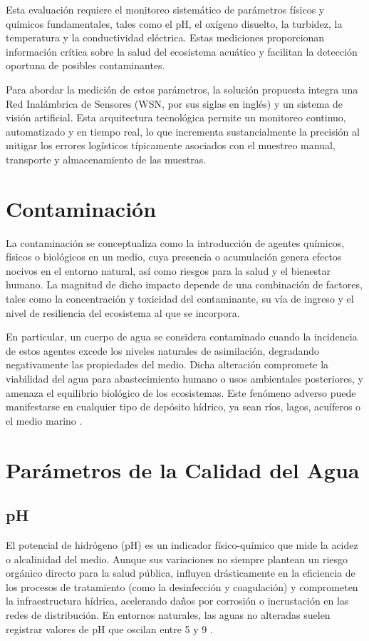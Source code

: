 Esta evaluación requiere el monitoreo sistemático de parámetros físicos y químicos fundamentales, tales como el pH, el oxígeno disuelto, la turbidez, la temperatura y la conductividad eléctrica. Estas mediciones proporcionan información crítica sobre la salud del ecosistema acuático y facilitan la detección oportuna de posibles contaminantes.

Para abordar la medición de estos parámetros, la solución propuesta integra una Red Inalámbrica de Sensores (WSN, por sus siglas en inglés) y un sistema de visión artificial. Esta arquitectura tecnológica permite un monitoreo continuo, automatizado y en tiempo real, lo que incrementa sustancialmente la precisión al mitigar los errores logísticos típicamente asociados con el muestreo manual, transporte y almacenamiento de las muestras.

\section{Contaminación}
La contaminación se conceptualiza como la introducción de agentes químicos, físicos o biológicos en un medio, cuya presencia o acumulación genera efectos nocivos en el entorno natural, así como riesgos para la salud y el bienestar humano. La magnitud de dicho impacto depende de una combinación de factores, tales como la concentración y toxicidad del contaminante, su vía de ingreso y el nivel de resiliencia del ecosistema al que se incorpora.

En particular, un cuerpo de agua se considera contaminado cuando la incidencia de estos agentes excede los niveles naturales de asimilación, degradando negativamente las propiedades del medio. Dicha alteración compromete la viabilidad del agua para abastecimiento humano o usos ambientales posteriores, y amenaza el equilibrio biológico de los ecosistemas. Este fenómeno adverso puede manifestarse en cualquier tipo de depósito hídrico, ya sean ríos, lagos, acuíferos o el medio marino \cite{agua2024contaminacion}.


\section{Parámetros de la Calidad del Agua}

\subsection{pH}
El potencial de hidrógeno (pH) es un indicador físico-químico que mide la acidez o alcalinidad del medio. Aunque sus variaciones no siempre plantean un riesgo orgánico directo para la salud pública, influyen drásticamente en la eficiencia de los procesos de tratamiento (como la desinfección y coagulación) y comprometen la infraestructura hídrica, acelerando daños por corrosión o incrustación en las redes de distribución. En entornos naturales, las aguas no alteradas suelen registrar valores de pH que oscilan entre 5 y 9 \cite{uno2020}. 

